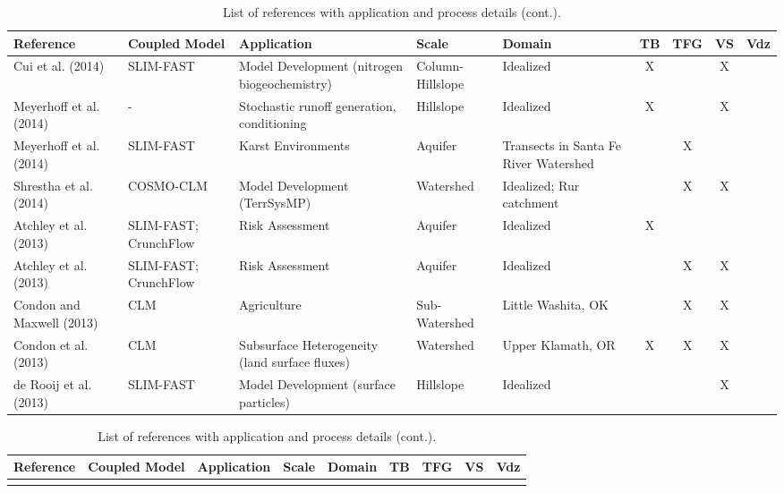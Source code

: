 {%

\begin{table} \center
\renewcommand{\arraystretch}{2.5}
\center
\caption{List of \parflow{} references with application and process details (cont.).}
\begin{tabular}{ l  p{1.5cm} p{2cm} p{1.5cm} p{1.5cm} | c | c | c | c }
\bf{Reference} & \bf{Coupled Model} & \bf{Application} & \bf{Scale} & \bf{Domain} & \bf{TB} & \bf{TFG} & \bf{VS} & \bf{Vdz} \\   
\hline{}

\cite{Cui14} Cui et al. (2014) & SLIM-FAST & Model Development (nitrogen biogeochemistry) & Column-Hillslope & Idealized & X &   & X &     \\
\cite{Meyerhoff14a} Meyerhoff et al. (2014) & - & Stochastic runoff generation, conditioning & Hillslope & Idealized & X &   & X &     \\
\cite{Meyerhoff14b} Meyerhoff et al. (2014) & SLIM-FAST & Karst Environments & Aquifer & Transects in Santa Fe River Watershed &   & X &   &       \\
\cite{Shrestha14} Shrestha et al. (2014) & COSMO-CLM & Model Development (TerrSysMP) & Watershed & Idealized; Rur catchment &   & X & X &     \\
\cite{Atchley13a} Atchley et al. (2013) & SLIM-FAST; CrunchFlow & Risk Assessment & Aquifer & Idealized & X &   &   &     \\ 
\cite{Atchley13b} Atchley et al. (2013) & SLIM-FAST; CrunchFlow & Risk Assessment & Aquifer & Idealized &   & X & X &     \\
\cite{Condon13a} Condon and Maxwell (2013) & CLM & Agriculture & Sub-Watershed & Little Washita, OK &   & X & X &     \\
\cite{Condon13b} Condon et al. (2013) & CLM & Subsurface Heterogeneity (land surface fluxes) & Watershed & Upper Klamath, OR & X & X & X &     \\
\cite{deRooij13} de Rooij et al. (2013) & SLIM-FAST & Model Development (surface particles) & Hillslope & Idealized  &   &   & X &     \\

\end{tabular}
\label{pfref5}
\end{table}


\begin{table} \center
\renewcommand{\arraystretch}{2.5}
\center
\caption{List of \parflow{} references with application and process details (cont.).}
\begin{tabular}{ l  p{1.5cm} p{2cm} p{1.5cm} p{1.5cm} | c | c | c | c }
\bf{Reference} & \bf{Coupled Model} & \bf{Application} & \bf{Scale} & \bf{Domain} & \bf{TB} & \bf{TFG} & \bf{VS} & \bf{Vdz} \\   
\hline{}


\end{tabular}
\end{table}}
